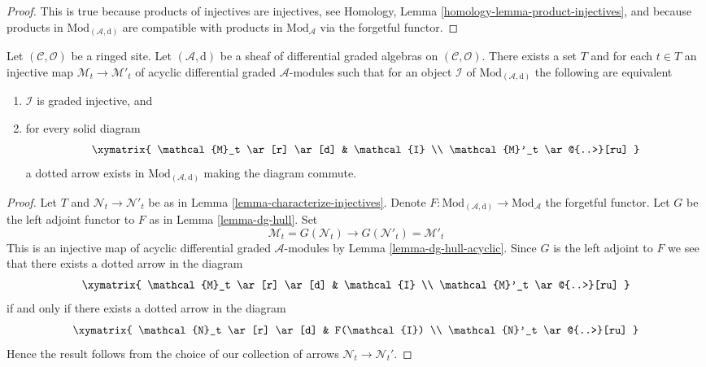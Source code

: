 \begin{proof}
This is true because products of injectives are injectives, see
Homology, Lemma \ref{homology-lemma-product-injectives}, and
because products in
$\text{Mod}_{(\mathcal{A}, \text{d})}$ are compatible with
products in $\text{Mod}_\mathcal{A}$ via the forgetful functor.
\end{proof}

\begin{lemma}
\label{lemma-characterize-graded-injectives-in-dg}
Let $(\mathcal{C}, \mathcal{O})$ be a ringed site.
Let $(\mathcal{A}, \text{d})$
be a sheaf of differential graded algebras on $(\mathcal{C}, \mathcal{O})$.
There exists a set $T$ and for each $t \in T$ an injective map
$\mathcal{M}_t \to \mathcal{M}'_t$ of
acyclic differential graded $\mathcal{A}$-modules
such that for an object $\mathcal{I}$ of $\text{Mod}_{(\mathcal{A}, \text{d})}$
the following are equivalent
\begin{enumerate}
\item $\mathcal{I}$ is graded injective, and
\item for every solid diagram
$$
\xymatrix{
\mathcal{M}_t \ar[r] \ar[d] & \mathcal{I} \\
\mathcal{M}'_t \ar@{..>}[ru]
}
$$
a dotted arrow exists in $\text{Mod}_{(\mathcal{A}, \text{d})}$
making the diagram commute.
\end{enumerate}
\end{lemma}

\begin{proof}
Let $T$ and $\mathcal{N}_t \to \mathcal{N}'_t$ be as in
Lemma \ref{lemma-characterize-injectives}.
Denote $F : \text{Mod}_{(\mathcal{A}, \text{d})} \to \text{Mod}_\mathcal{A}$
the forgetful functor.
Let $G$ be the left adjoint functor to
$F$ as in Lemma \ref{lemma-dg-hull}. Set
$$
\mathcal{M}_t = G(\mathcal{N}_t) \to
G(\mathcal{N}'_t) = \mathcal{M}'_t
$$
This is an injective map of acyclic differential graded
$\mathcal{A}$-modules by Lemma \ref{lemma-dg-hull-acyclic}.
Since $G$ is the left adjoint to $F$ we see that
there exists a dotted arrow in the diagram
$$
\xymatrix{
\mathcal{M}_t \ar[r] \ar[d] & \mathcal{I} \\
\mathcal{M}'_t \ar@{..>}[ru]
}
$$
if and only if there exists a dotted arrow in the diagram
$$
\xymatrix{
\mathcal{N}_t \ar[r] \ar[d] & F(\mathcal{I}) \\
\mathcal{N}'_t \ar@{..>}[ru]
}
$$
Hence the result follows from the choice of our
collection of arrows $\mathcal{N}_t \to \mathcal{N}_t'$.
\end{proof}


